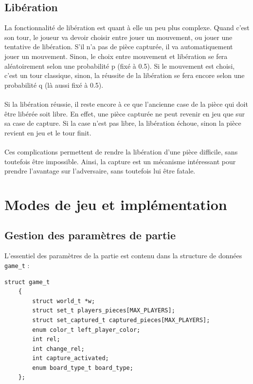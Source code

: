 \documentclass{article}
\begin{document}
\subsection{Libération}
\label{liberation}

La fonctionnalité de libération est quant à elle un peu plus complexe. Quand c'est son tour, le joueur va devoir choisir entre jouer un mouvement, ou
jouer une tentative de libération. S'il n'a pas de pièce capturée, il va automatiquement jouer un mouvement. Sinon, le choix entre mouvement et libération se
fera aléatoirement selon une probabilité p (fixé à 0.5). Si le mouvement est choisi, c'est un tour classique, sinon, la réussite de la libération 
se fera encore selon une probabilité q (là aussi fixé à 0.5).
\\\\
Si la libération réussie, il reste encore à ce que l'ancienne case de la pièce qui doit être libérée soit libre. En effet, une pièce capturée
ne peut revenir en jeu que sur sa case de capture. Si la case n'est pas libre, la libération échoue, sinon la pièce revient en jeu et le tour finit.
\\\\
Ces complications permettent de rendre la libération d'une pièce difficile, sans toutefois être impossible. Ainsi, la capture est un mécanisme
intéressant pour prendre l'avantage sur l'adversaire, sans toutefois lui être fatale.
\newpage
\section{Modes de jeu et implémentation}
\subsection{Gestion des paramètres de partie}
\label{gamet}
L'essentiel des paramètres de la partie est contenu dans la structure de données \lstinline{game_t} :

\begin{lstlisting}[caption=game\_t]
    struct game_t
    {
        struct world_t *w;
        struct set_t players_pieces[MAX_PLAYERS];
        struct set_captured_t captured_pieces[MAX_PLAYERS];
        enum color_t left_player_color;
        int rel;
        int change_rel;
        int capture_activated;
        enum board_type_t board_type;
    };
\end{lstlisting}
\end{document}
